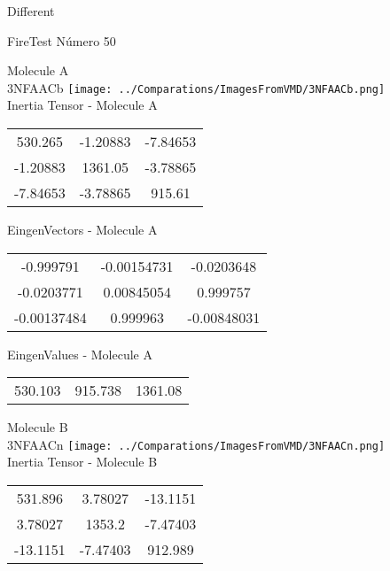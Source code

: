 \begin{center}
\vtab
\vtab
\textcolor{NavyBlue}{\Large Different}
\end{center}

 \newpage

\vtab[-2cm]
\begin{center}
{\large FireTest \tab Número 50}
\end{center}
\begin{multicols}{2}
\begin{center}

Molecule A \\ 
3NFAACb
\texttt{[image: ../Comparations/ImagesFromVMD/3NFAACb.png]}
\\
Inertia Tensor - Molecule A \\
\vtab

\begin{tabular}{|c c c|}
530.265	 & 	-1.20883	 & 	-7.84653	 \\
-1.20883	 & 	1361.05	 & 	-3.78865	 \\
-7.84653	 & 	-3.78865	 & 	915.61
\end{tabular}

\vtab
 EingenVectors - Molecule A     \\
\vtab
\begin{tabular}{|c c c|}
-0.999791	 & 	-0.00154731	 & 	-0.0203648	 \\
-0.0203771	 & 	0.00845054	 & 	0.999757	 \\
-0.00137484	 & 	0.999963	 & 	-0.00848031
\end{tabular}

\vtab
 EingenValues - Molecule A     \\
\vtab
\begin{tabular}{|c c c|}
530.103	 & 	915.738	 & 	1361.08	 \\
\end{tabular}
\columnbreak

Molecule B \\ 
3NFAACn
\texttt{[image: ../Comparations/ImagesFromVMD/3NFAACn.png]}
\\
Inertia Tensor - Molecule B \\
\vtab

\begin{tabular}{|c c c|}
531.896	 & 	3.78027	 & 	-13.1151	 \\
3.78027	 & 	1353.2	 & 	-7.47403	 \\
-13.1151	 & 	-7.47403	 & 	912.989
\end{tabular}


\end{center}
\end{multicols}
